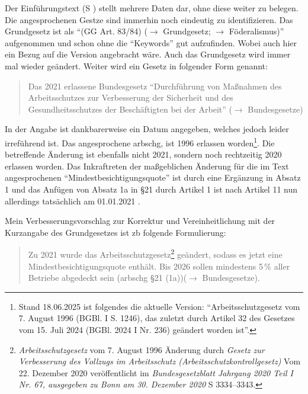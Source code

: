 Der Einführungstext (\gls{S} \pageref{DEMOKRATIE-A1}) stellt mehrere Daten dar, ohne diese weiter zu belegen.
Die angesprochenen Gestze sind immerhin noch eindeutig zu identifizieren. Das Grundgesetz ist als \enquote{(GG Art. 83/84) ($\rightarrow$ Grundgesetz; $\rightarrow$ Föderalismus)} aufgenommen und schon ohne die \enquote{Keywords} gut aufzufinden. Wobei auch hier ein Bezug auf die Version angebracht wäre. Auch das Grundgesetz wird immer mal wieder geändert.  
Weiter wird ein Gesetz in folgender Form genannt: 
\begin{quote}
    Das 2021 erlassene Bundesgesetz \enquote{Durchführung von Maßnahmen des Arbeitsschutzes zur  Verbesserung der Sicherheit und des Gesundheitsschutzes der Beschäftigten bei der Arbeit} ($\rightarrow$ Bundesgesetze)
\end{quote}
In der Angabe ist dankbarerweise ein Datum angegeben, welches jedoch leider irreführend ist. Das angesprochene \gls{arbschg}, ist 1996 erlassen worden\footnote{Stand 18.06.2025 ist folgendes die aktuelle Version: \enquote{Arbeitsschutzgesetz vom 7. August 1996 (BGBl. I S. 1246), das zuletzt durch Artikel 32 des Gesetzes vom 15. Juli 2024 (BGBl. 2024 I Nr. 236) geändert worden ist}.}. Die betreffende Änderung ist ebenfalls nicht 2021, sondern noch rechtzeitig 2020 erlassen worden. Das Inkraftreten der maßgeblichen Änderung für die im Text angesprochenen \enquote{Mindestbesichtigungsquote} ist durch eine Ergänzung in Absatz 1 und das Anfügen von Absatz 1a in §21 %
durch Artikel 1 ist nach Artikel 11 nun allerdings tatsächlich am 01.01.2021 \autocite[3334–3343]{BGBl.2020-I-Nr67}. 

Mein Verbesserungsvorschlag zur Korrektur und Vereinheitlichung mit der Kurzangabe des Grundgesetzes ist \gls{zb} folgende Formulierung:
\begin{quote}
Zu 2021 wurde das Arbeitsschutzgesetz\footnote{
    \emph{Arbeitsschutzgesetz} vom 7. August 1996 Änderung durch \emph{Gesetz zur Verbesserung des Vollzugs im Arbeitsschutz (Arbeitsschutzkontrollgesetz)} Vom 22. Dezember 2020 veröffentlicht im \emph{Bundesgesetzblatt Jahrgang 2020 Teil I Nr. 67, ausgegeben zu Bonn am 30. Dezember 2020} \gls{S} 3334–3343.\label{ArbschSchGfooty}} 
    geändert, sodass es jetzt eine Mindestbesichtigungsquote enthält. %
    Bis 2026 sollen mindestens 5\,\% aller Betriebe abgedeckt sein (\gls{arbschg} §21 (1a))($\rightarrow$ Bundesgesetze). 
\end{quote}

